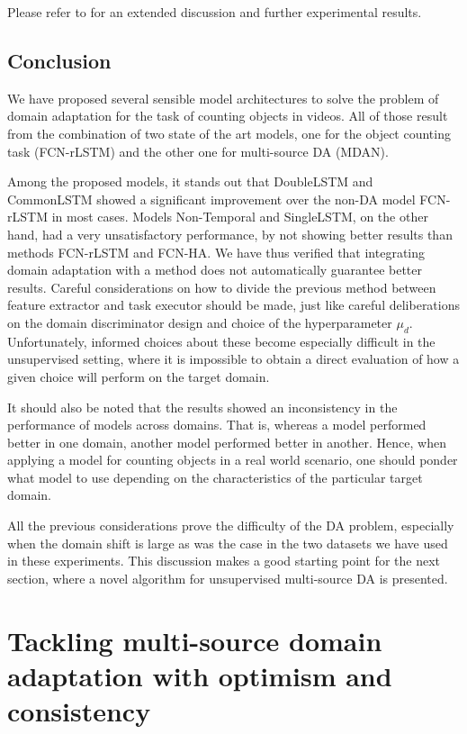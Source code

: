 Please refer to \citet{ThesisFrancisco} for an extended discussion and further experimental results.

\subsection{Conclusion}

We have proposed several sensible model architectures to solve the problem of domain adaptation for the task of counting objects in videos. All of those result from the combination of two state of the art models, one for the object counting task (FCN-rLSTM) and the other one for multi-source DA (MDAN). 

Among the proposed models, it stands out that DoubleLSTM and CommonLSTM showed a significant improvement over the non-DA model FCN-rLSTM in most cases. Models Non-Temporal and SingleLSTM, on the other hand, had a very unsatisfactory performance, by not showing better results than methods FCN-rLSTM and FCN-HA. We have thus verified that integrating domain adaptation with a method does not automatically guarantee better results. Careful considerations on how to divide the previous method between feature extractor and task executor should be made, just like careful deliberations on the domain discriminator design and choice of the hyperparameter $\mu_d$. Unfortunately, informed choices about these become especially difficult in the unsupervised setting, where it is impossible to obtain a direct evaluation of how a given choice will perform on the target domain.

It should also be noted that the results showed an inconsistency in the performance of models across domains. That is, whereas a model performed better in one domain, another model performed better in another. Hence, when applying a model for counting objects in a real world scenario, one should ponder what model to use depending on the characteristics of the particular target domain.

All the previous considerations prove the difficulty of the DA problem, especially when the domain shift is large as was the case in the two datasets we have used in these experiments. This discussion makes a good starting point for the next section, where a novel algorithm for unsupervised multi-source DA is presented.

\section{Tackling multi-source domain adaptation with optimism and consistency}
\label{sec:modafm}

